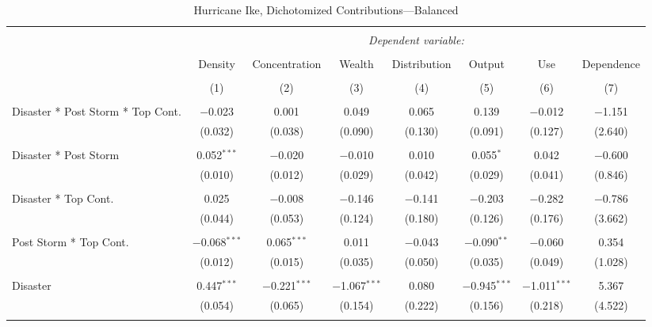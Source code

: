
\begin{table}[!htbp] \centering 
  \caption{Hurricane Ike, Dichotomized Contributions---Balanced} 
  \label{} 
\footnotesize 
\begin{tabular}{@{\extracolsep{5pt}}lccccccc} 
\\[-1.8ex]\hline 
\hline \\[-1.8ex] 
 & \multicolumn{7}{c}{\textit{Dependent variable:}} \\ 
\cline{2-8} 
\\[-1.8ex] & Density & Concentration & Wealth & Distribution & Output & Use & Dependence \\ 
\\[-1.8ex] & (1) & (2) & (3) & (4) & (5) & (6) & (7)\\ 
\hline \\[-1.8ex] 
 Disaster * Post Storm * Top Cont. & $-$0.023 & 0.001 & 0.049 & 0.065 & 0.139 & $-$0.012 & $-$1.151 \\ 
  & (0.032) & (0.038) & (0.090) & (0.130) & (0.091) & (0.127) & (2.640) \\ 
  & & & & & & & \\ 
 Disaster * Post Storm & 0.052$^{***}$ & $-$0.020 & $-$0.010 & 0.010 & 0.055$^{*}$ & 0.042 & $-$0.600 \\ 
  & (0.010) & (0.012) & (0.029) & (0.042) & (0.029) & (0.041) & (0.846) \\ 
  & & & & & & & \\ 
 Disaster * Top Cont. & 0.025 & $-$0.008 & $-$0.146 & $-$0.141 & $-$0.203 & $-$0.282 & $-$0.786 \\ 
  & (0.044) & (0.053) & (0.124) & (0.180) & (0.126) & (0.176) & (3.662) \\ 
  & & & & & & & \\ 
 Post Storm *  Top Cont. & $-$0.068$^{***}$ & 0.065$^{***}$ & 0.011 & $-$0.043 & $-$0.090$^{**}$ & $-$0.060 & 0.354 \\ 
  & (0.012) & (0.015) & (0.035) & (0.050) & (0.035) & (0.049) & (1.028) \\ 
  & & & & & & & \\ 
 Disaster & 0.447$^{***}$ & $-$0.221$^{***}$ & $-$1.067$^{***}$ & 0.080 & $-$0.945$^{***}$ & $-$1.011$^{***}$ & 5.367 \\ 
  & (0.054) & (0.065) & (0.154) & (0.222) & (0.156) & (0.218) & (4.522) \\ 
  & & & & & & & \\ 

\end{tabular}
\end{table}
